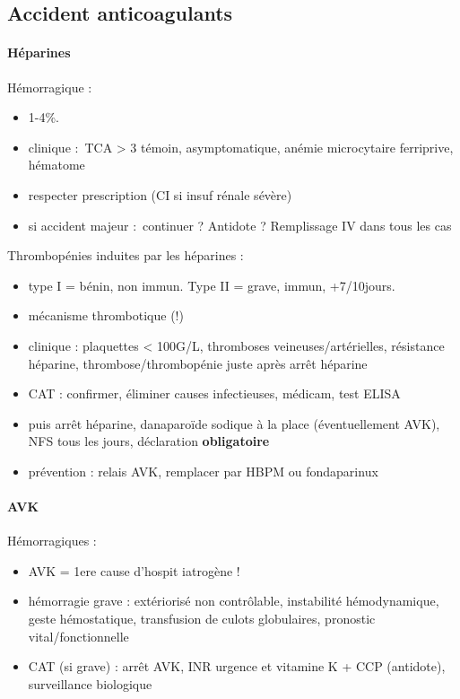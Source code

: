 \documentclass{article}
\begin{document}
\subsection{Accident anticoagulants}
\paragraph{Héparines}
Hémorragique : 
\begin{itemize}
  \item 1-4\%.
  \item clinique : TCA > 3 témoin, asymptomatique, anémie microcytaire
    ferriprive, hématome
  \item respecter prescription (CI si insuf rénale sévère)
  \item si accident majeur : continuer ? Antidote ? Remplissage IV dans tous les
    cas
\end{itemize}
Thrombopénies induites par les héparines : 
\begin{itemize}
  \item type I = bénin, non immun. Type II = grave, immun, +7/10jours.
  \item mécanisme thrombotique (!)
  \item clinique : plaquettes < 100G/L, thromboses veineuses/artérielles,
    résistance héparine, thrombose/thrombopénie juste après arrêt héparine
  \item CAT : confirmer, éliminer causes infectieuses, médicam, test ELISA
  \item puis arrêt héparine, danaparoïde sodique à la place (éventuellement
    AVK), NFS tous les jours, déclaration \textbf{obligatoire} 
  \item prévention : relais AVK, remplacer par HBPM ou fondaparinux
\end{itemize}

\paragraph{AVK}
Hémorragiques : 
\begin{itemize}
  \item AVK = 1ere cause d'hospit iatrogène !
  \item hémorragie grave : extériorisé non contrôlable, instabilité
    hémodynamique, geste hémostatique, transfusion de culots globulaires,
    pronostic vital/fonctionnelle
  \item CAT (si grave) : arrêt AVK, INR urgence et vitamine K + CCP (antidote),
    surveillance biologique
\end{itemize}


\printglossary
\printglossary[type=\acronymtype]
\end{document}
